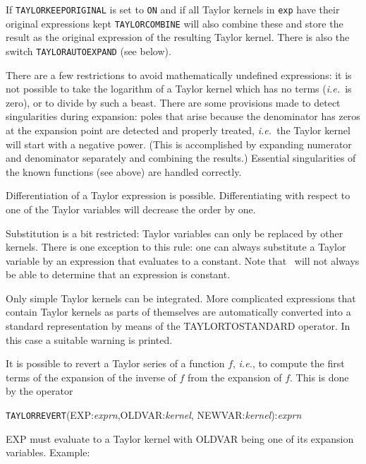 If \verb|TAYLORKEEPORIGINAL| is set to \verb|ON| and if all Taylor
kernels in \verb|exp| have their original expressions kept
\verb|TAYLORCOMBINE| will also combine these and store the result
as the original expression of the resulting Taylor kernel.
There is also the switch \verb|TAYLORAUTOEXPAND| (see below).

There are a few restrictions to avoid mathematically undefined
expressions: it is not possible to take the logarithm of a Taylor
kernel which has no terms ({\em i.e.\ }is zero), or to divide by such a
beast.  There are some provisions made to detect singularities during
expansion: poles that arise because the denominator has zeros at the
expansion point are detected and properly treated, {\em i.e.\ }the Taylor
kernel will start with a negative power.  (This is accomplished by
expanding numerator and denominator separately and combining the
results.)  Essential singularities of the known functions (see above)
are handled correctly.

Differentiation of a Taylor expression is possible.  Differentiating
with respect to one of the Taylor variables will decrease the order by one. 

Substitution is a bit restricted: Taylor variables can only be replaced
by other kernels.  There is one exception to this rule: one can always
substitute a Taylor variable by an expression that evaluates to a
constant.  Note that \REDUCE\ will not always be able to determine
that an expression is constant.

Only simple Taylor kernels can be integrated. More complicated
expressions that contain Taylor kernels as parts of themselves are
automatically converted into a standard representation by means of the
TAYLORTOSTANDARD operator.  In this case a suitable warning is printed.

 It is possible to revert a Taylor
series of a function $f$, {\em i.e.}, to compute the first terms of the
expansion of the inverse of $f$ from the expansion of $f$. This is
done by the operator

\hspace*{2em} {\tt TAYLORREVERT}(EXP:{\em exprn},OLDVAR:{\em kernel},
                                 NEWVAR:{\em kernel}):{\em exprn}

EXP must evaluate to a Taylor kernel with OLDVAR being one of its
expansion variables. Example:

